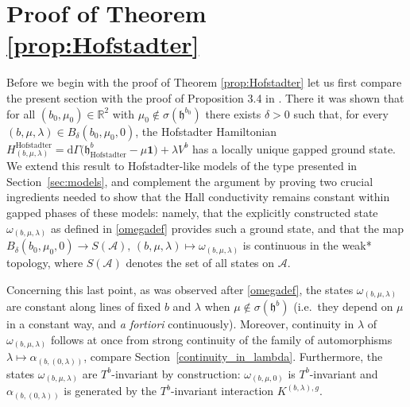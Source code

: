 \documentclass[a4paper]{article}
\newcommand{\w}{\omega}
\newcommand{\mA}{\mathcal{A}}
\newcommand{\R}{\mathbb{R}}
\theoremstyle{plain}
\theoremstyle{definition}
\theoremstyle{remark}
\renewcommand{\(}{\left(}
\renewcommand{\)}{\right)}
\begin{document}
\section{Proof of Theorem \ref{prop:Hofstadter}} \label{sec:Hofstadter}
 Before we begin with the proof of Theorem \ref{prop:Hofstadter} let us first compare the present section with the proof of Proposition 3.4 in  \cite{WMMMT24}. There  it was shown that for all $(b_0,\mu_0) \in \R^2$ with $\mu_0 \notin \sigma(\mathfrak{h}^{b_0})$ there exists $\delta>0$ such that, for every $(b,\mu,\lambda)\in B_{\delta}(b_0,\mu_0,0)$, the Hofstadter Hamiltonian $H^{\mathrm{Hofstadter}}_{(b,\mu,\lambda)} = \mathrm{d} \Gamma \big(\mathfrak{h}_{\mathrm{Hofstadter}}^{b}-\mu\mathbf{1}\big)+\lambda V^b$ has a locally unique gapped ground state. We extend this result to Hofstadter-like models of the type presented in Section~\ref{sec:models}, and complement the argument by proving two crucial ingredients needed to show that the Hall conductivity remains constant within gapped phases of these models: namely, that  the explicitly constructed state  $\w_{(b,\mu,\lambda)}$ as defined in \eqref{omegadef} provides such a ground state, and that the map $B_{\delta}(b_0,\mu_0,0) \to S(\mA) , \, (b,\mu,\lambda)\mapsto \w_{(b,\mu,\lambda)}$ is continuous in the weak* topology,
where $S(\mathcal{A})$ denotes the set of all states on $\mathcal{A}$.


Concerning this last point, as was observed after \eqref{omegadef}, the states $\w_{(b,\mu,\lambda)}$ are constant along lines of fixed $b$ and $\lambda$ when $\mu \notin \sigma(\mathfrak{h}^b)$ (i.e.\ they depend on $\mu$ in a constant way, and {\it a fortiori} continuously). Moreover, continuity in $\lambda$ of $\w_{(b,\mu,\lambda)}$ follows at once from strong continuity of the family of automorphisms $\lambda \mapsto \alpha_{(b,(0,\lambda))}$, compare Section~\ref{continuity_in_lambda}. Furthermore, the states $\w_{(b,\mu,\lambda)}$ are $T^b$-invariant by construction:  $\w_{(b,\mu,0)}$ is $T^b$-invariant and  $\alpha_{(b,(0,\lambda))}$ is generated by the $T^b$-invariant interaction $K^{(b,\lambda),g}$.
\end{document}

